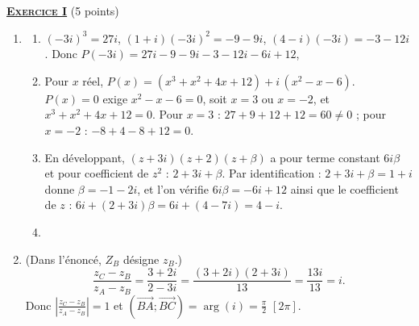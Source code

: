 \providecommand{\Plan}{(\mathscr{P})}
\providecommand{\Ouv}{(O ; \vec{u} , \vec{v})}
\providecommand{\Courbe}{(\mathscr{C})}
\providecommand{\cm}{~\mathrm{cm}}
\providecommand{\dx}{~\mathrm{d}x}
%
\noindent \underline{\textsc{\textbf{Exercice I}}} (5 points)
\begin{enumerate}
   \item
      \begin{enumerate}
         \item {}
            $(-3i)^3 = 27i$, $(1 + i)(-3i)^2 = -9 - 9i$, $(4 - i)(-3i) = -3 - 12i$. Donc
            $P(-3i) = 27i - 9 - 9i - 3 - 12i - 6i + 12$, 
         \item {}
            Pour $x$ r\'eel, $P(x) = (x^3 + x^2 + 4x + 12) + i\,(x^2 - x - 6)$. $P(x) = 0$ exige
            $x^2 - x - 6 = 0$, soit $x = 3$ ou $x = -2$, et $x^3 + x^2 + 4x + 12 = 0$.
            Pour $x = 3$ : $27 + 9 + 12 + 12 = 60 \neq 0$ ; pour $x = -2$ : $-8 + 4 - 8 + 12 = 0$.
            \par\noindent{}
         \item {}
            En d\'eveloppant, $(z + 3i)(z + 2)(z + \beta)$ a pour terme constant $6i\beta$ et pour coefficient de $z^2$ : $2 + 3i + \beta$.
            Par identification : $2 + 3i + \beta = 1 + i$ donne $\beta = -1 - 2i$, et l'on v\'erifie $6i\beta = -6i + 12$
            ainsi que le coefficient de $z$ : $6i + (2 + 3i)\beta = 6i + (4 - 7i) = 4 - i$.
            \par\noindent{}
         \item {} 
      \end{enumerate}
   \item {}
      (Dans l'\'enonc\'e, $Z_B$ d\'esigne $z_B$.)
      \[
         \frac{z_C - z_B}{z_A - z_B} = \frac{3 + 2i}{2 - 3i} = \frac{(3 + 2i)(2 + 3i)}{13} = \frac{13i}{13} = i.
      \]
      Donc $\left|\frac{z_C - z_B}{z_A - z_B}\right| = 1$ et $\left(\overrightarrow{BA} ; \overrightarrow{BC}\right) = \arg(i) = \frac{\pi}{2}$ $[2\pi]$.
      \par\noindent{}

\end{enumerate}
